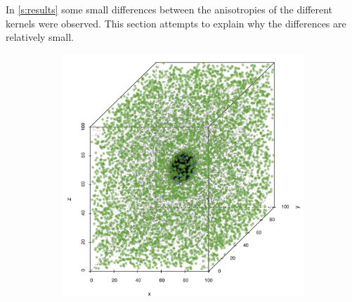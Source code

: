 
	In \cref{s:results} some small differences between the anisotropies of the different kernels were observed. This section attempts to explain why the differences are relatively small.

			\begin{figure}
				\centering
				\begin{subfigure}{0.23\textwidth}
					\centering
					\includegraphics[keepaspectratio=true, width=\textwidth, height=0.23\textheight]{discussion/img/ferdosi_1_60000_anisotropy.png}
					\caption{}
					\label{fig:discussion:anisotropy:ferdosi1}
				\end{subfigure}
				\begin{subfigure}{0.23\textwidth}
					\centering

\end{subfigure}
\end{figure}
